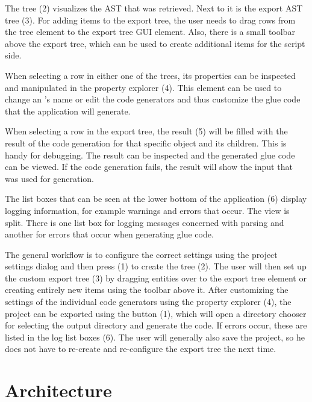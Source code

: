 The  tree (2) visualizes the  AST that was retrieved. Next to it is the export AST tree (3). For adding items to the export tree, the user needs to drag rows from the  tree element to the export tree GUI element. Also, there is a small toolbar above the export tree, which can be used to create additional items for the script side.

When selecting a row in either one of the trees, its properties can be inspected and manipulated in the property explorer (4). This element can be used to change an 's name or edit the code generators and thus customize the glue code that the application will generate. 

When selecting a row in the export tree, the result  (5) will be filled with the result of the code generation for that specific object and its children. This is handy for debugging. The result can be inspected and the generated glue code can be viewed. If the code generation fails, the result   will show the input that was used for generation.

The list boxes that can be seen at the lower bottom of the application (6) display logging information, for example warnings and errors that occur. The view is split. There is one list box for logging messages concerned with  parsing and another for errors that occur when generating glue code.

The general workflow is to configure the correct settings using the project settings dialog and then press  (1) to create the  tree (2). The user will then set up the custom export tree (3) by dragging  entities over to the export tree element or creating entirely new items using the toolbar above it. After customizing the settings of the individual code generators using the property explorer (4), the project can be exported using the  button (1), which will open a directory chooser for selecting the output directory and generate the code. If errors occur, these are listed in the log list boxes (6). The user will generally also save the project, so he does not have to re-create and re-configure the export tree the next time.

\section{Architecture}

